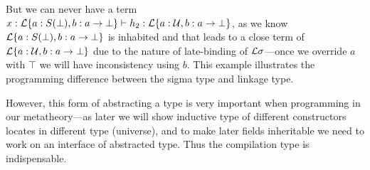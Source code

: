 But we can never have a term $x : {\mathcal{L}}\{a : S(\bot), b : a \to \bot \} \vdash h_2 : {\mathcal{L}}\{a : {\mathcal{U}}, b : a \to \bot \}$, as we know ${\mathcal{L}}\{a : S(\bot), b : a \to \bot \}$ is inhabited
and that leads to a close term of ${\mathcal{L}}\{a : {\mathcal{U}}, b : a \to \bot \}$ due to the nature of late-binding of ${\mathcal{L}}\sigma$---once we override $a$ with $\top$ we will have inconsistency using $b$. This example illustrates the programming difference between the sigma type and linkage type.  

However, this form of abstracting a type is very important when programming in our metatheory---as later we will show inductive type of different constructors locates in different type (universe), and to make later fields inheritable we need to work on an interface of abstracted type. Thus the compilation type is indispensable.



